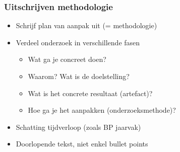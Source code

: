 \documentclass[aspectratio=169]{beamer}
\begin{document}
\begin{frame}
  \frametitle{Uitschrijven methodologie}

  \begin{itemize}
    \item Schrijf plan van aanpak uit (= methodologie)
    \item Verdeel onderzoek in verschillende fasen
          \begin{itemize}
            \item Wat ga je concreet doen?
            \item Waarom? Wat is de doelstelling?
            \item Wat is het concrete resultaat (artefact)?
            \item Hoe ga je het aanpakken (onderzoeksmethode)?
          \end{itemize}
    \item Schatting tijdverloop (zoals BP jaarvak)
    \item Doorlopende tekst, niet enkel bullet points
  \end{itemize}

\end{frame}
\end{document}
